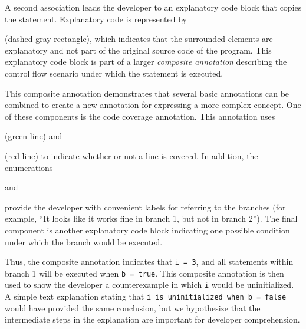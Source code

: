 \documentclass[conference]{IEEEtran}
\begin{document}
A second association leads the developer to an explanatory code block that copies the statement. Explanatory code is represented by
 (dashed gray rectangle), which indicates that the surrounded elements are explanatory and not part of the original source code of the program. This explanatory code block is part of a larger \textit{composite annotation} describing the control flow scenario under which the statement is executed.

This composite annotation demonstrates that several basic annotations can be combined to create a new annotation for expressing a more complex concept. One of these components is the code coverage annotation. This annotation uses
 (green line) and 
 (red line) to indicate whether or not a line is covered. In addition, the enumerations  and  provide the developer with convenient labels for referring to the branches (for example, ``It looks like it works fine in branch 1, but not in branch 2''). The final component is another explanatory code block indicating one possible condition under which the branch would be executed.

Thus, the composite annotation indicates that \texttt{i = 3}, and all statements within branch 1 will be executed when \texttt{b = true}. This composite annotation is then used to show the developer a counterexample in which \texttt{i} would be uninitialized. A simple text explanation stating that \texttt{i is uninitialized when b = false} would have provided the same conclusion, but we hypothesize that the intermediate steps in the explanation are important for developer comprehension.
\end{document}
